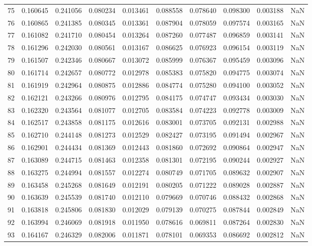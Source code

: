 \begin{tabular}{lrrrrrrrrr}
75 & 0.160645 & 0.241056 & 0.080234 & 0.013461 & 0.088558 & 0.078640 & 0.098300 & 0.003188 & NaN \\
76 & 0.160865 & 0.241385 & 0.080345 & 0.013361 & 0.087904 & 0.078059 & 0.097574 & 0.003165 & NaN \\
77 & 0.161082 & 0.241710 & 0.080454 & 0.013264 & 0.087260 & 0.077487 & 0.096859 & 0.003141 & NaN \\
78 & 0.161296 & 0.242030 & 0.080561 & 0.013167 & 0.086625 & 0.076923 & 0.096154 & 0.003119 & NaN \\
79 & 0.161507 & 0.242346 & 0.080667 & 0.013072 & 0.085999 & 0.076367 & 0.095459 & 0.003096 & NaN \\
80 & 0.161714 & 0.242657 & 0.080772 & 0.012978 & 0.085383 & 0.075820 & 0.094775 & 0.003074 & NaN \\
81 & 0.161919 & 0.242964 & 0.080875 & 0.012886 & 0.084774 & 0.075280 & 0.094100 & 0.003052 & NaN \\
82 & 0.162121 & 0.243266 & 0.080976 & 0.012795 & 0.084175 & 0.074747 & 0.093434 & 0.003030 & NaN \\
83 & 0.162320 & 0.243564 & 0.081077 & 0.012705 & 0.083584 & 0.074223 & 0.092778 & 0.003009 & NaN \\
84 & 0.162517 & 0.243858 & 0.081175 & 0.012616 & 0.083001 & 0.073705 & 0.092131 & 0.002988 & NaN \\
85 & 0.162710 & 0.244148 & 0.081273 & 0.012529 & 0.082427 & 0.073195 & 0.091494 & 0.002967 & NaN \\
86 & 0.162901 & 0.244434 & 0.081369 & 0.012443 & 0.081860 & 0.072692 & 0.090864 & 0.002947 & NaN \\
87 & 0.163089 & 0.244715 & 0.081463 & 0.012358 & 0.081301 & 0.072195 & 0.090244 & 0.002927 & NaN \\
88 & 0.163275 & 0.244994 & 0.081557 & 0.012274 & 0.080749 & 0.071705 & 0.089632 & 0.002907 & NaN \\
89 & 0.163458 & 0.245268 & 0.081649 & 0.012191 & 0.080205 & 0.071222 & 0.089028 & 0.002887 & NaN \\
90 & 0.163639 & 0.245539 & 0.081740 & 0.012110 & 0.079669 & 0.070746 & 0.088432 & 0.002868 & NaN \\
91 & 0.163818 & 0.245806 & 0.081830 & 0.012029 & 0.079139 & 0.070275 & 0.087844 & 0.002849 & NaN \\
92 & 0.163994 & 0.246069 & 0.081918 & 0.011950 & 0.078616 & 0.069811 & 0.087264 & 0.002830 & NaN \\
93 & 0.164167 & 0.246329 & 0.082006 & 0.011871 & 0.078101 & 0.069353 & 0.086692 & 0.002812 & NaN \\

\end{tabular}
